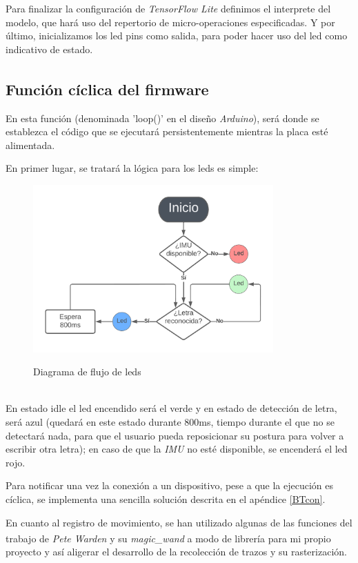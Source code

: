 Para finalizar la configuración de \textit{TensorFlow Lite} definimos el interprete del modelo, que hará
uso del repertorio de micro-operaciones especificadas.\newline
Y por último, inicializamos los led pins como salida, para poder hacer uso
del led como indicativo de estado.

\subsection{Función cíclica del firmware\textsuperscript{\cite{andriyadimw,petewardenmw}}}
En esta función (denominada 'loop()' en el diseño \textit{Arduino}),
será donde se establezca el código que se ejecutará persistentemente
mientras la placa esté alimentada.

En primer lugar, se tratará la lógica para los leds es simple:
\begin{figure}[h]
    \centering
    \includegraphics[width=0.82\textwidth]{capturas/DiagramaFlujoLeds.png}\\[-0,20cm]
    \caption{Diagrama de flujo de leds}
\end{figure}\\
En estado idle el led
encendido será el verde y en estado de detección de letra, será azul (quedará en este estado
durante 800ms, tiempo durante el que no se detectará nada, para que el usuario pueda
reposicionar su postura para volver a escribir otra letra); en caso de que la \textit{IMU}
no esté disponible, se encenderá el led rojo.

Para notificar una vez la conexión a un dispositivo, pese a que
la ejecución es cíclica, se implementa una sencilla solución descrita en el
apéndice \ref{BTcon}.

En cuanto al registro de movimiento, se han utilizado algunas de las funciones
del trabajo de \textit{Pete Warden} y su \textit{magic\_wand}\textsuperscript{\cite{petewardenmw}}
a modo de librería para mi propio proyecto y así aligerar el desarrollo de
la recolección de trazos y su rasterización.

